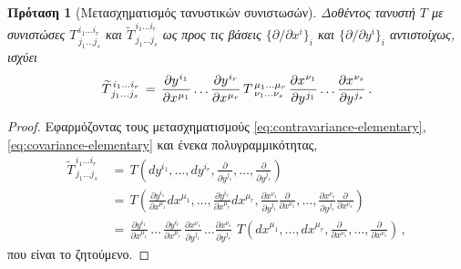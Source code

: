 \documentclass[11pt,a4paper,twoside,openright]{book}
\newtheorem{proposition}[lemma]{Πρόταση}
\begin{document}
\begin{proposition}[Μετασχηματισμός τανυστικών συνιστωσών]
	\label{prop:tensor-transform}
Δοθέντος τανυστή $Τ$ με συνιστώσες
$Τ^{\,i_1 \dots i_r}_{\,j_1 \dots j_s}$ και
$\widetilde{T}^{\,i_1 \dots i_r}_{\,j_1 \dots j_s}$ ως προς τις βάσεις $\{\partial/\partial x^i\}_i$ και $\{\partial/\partial y^i\}_i$ αντιστοίχως, ισχύει
\begin{equation}\label{eq:tensor-transform}
\widetilde{T}^{\,i_1 \dots i_r}_{\,j_1 \dots j_s}
\,=\,
\frac{\partial y^{\hspace{.5pt}i_1}}{\partial x^{\hspace{.5pt}\mu_1}}
\dots
\frac{\partial y^{\hspace{.5pt}i_r}}{\partial x^{\hspace{.5pt}\mu_r}}
\,
T^{\,\mu_1 \dots \mu_r}_{\,\,\nu_1 \dots \nu_s}
\,
\frac{\partial x^{\hspace{.5pt}\nu_1}}{\partial y^{\hspace{.5pt}j_1}}
\dots
\frac{\partial x^{\hspace{.5pt}\nu_s}}{\partial y^{\hspace{.5pt}j_s}}
\,.
\end{equation}
\end{proposition}
\begin{proof}
Εφαρμόζοντας τους μετασχηματισμούς \eqref{eq:contravariance-elementary}, \eqref{eq:covariance-elementary} και
ένεκα πολυγραμμικότητας,
\setlength{\jot}{12pt}
\begin{equation*}
\begin{aligned}
\widetilde{T}^{\,i_1 \dots i_r}_{\,j_1 \dots j_s}
\,
&=
\,
T\left(
dy^{i_1}, \dots, dy^{i_r},
\frac{\partial}{\partial y^{j_1}}, \dots, \frac{\partial}{\partial y^{j_s}}
\right)
\\
&=
\,
T\left(
\frac{\partial y^{i_1}}{\partial x^{\mu_1}} dx^{\mu_1},
\dots,
\frac{\partial y^{i_r}}{\partial x^{\mu_r}} dx^{\mu_r},
\frac{\partial x^{\nu_1}}{\partial y^{j_1}} \frac{\partial}{\partial x^{\nu_1}},
\dots,
\frac{\partial x^{\nu_s}}{\partial y^{j_s}} \frac{\partial}{\partial x^{\nu_s}}
\right)
\\
&=
\,
\frac{\partial y^{i_1}}{\partial x^{\mu_1}}
\,
\dots
\,
\frac{\partial y^{i_r}}{\partial x^{\mu_r}}
\,
\frac{\partial x^{\nu_1}}{\partial y^{j_1}}
\,
\dots
\frac{\partial x^{\nu_s}}{\partial y^{j_s}}
\,\,
T\left(
dx^{\mu_1}, \dots, dx^{\mu_r},
\frac{\partial}{\partial x^{\nu_1}}, \dots, \frac{\partial}{\partial x^{\nu_s}}
\right)\,,
\end{aligned}
\end{equation*}
που είναι το ζητούμενο.
\end{proof}
\end{document}
